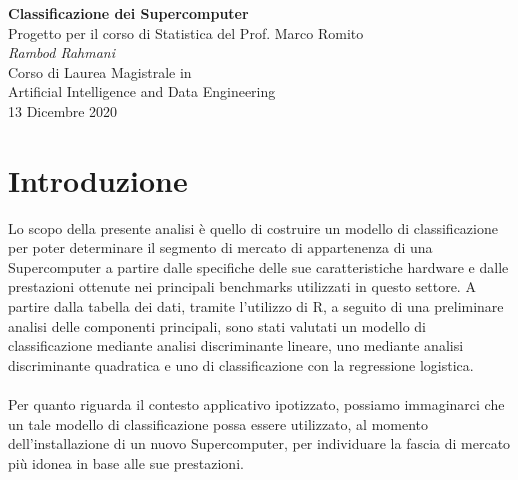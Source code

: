 \documentclass[11pt,a4paper]{article}
\begin{document}
\begin{center}
	\Large\textbf{Classificazione dei Supercomputer}\\
	\vspace{0.2cm}
	\large{Progetto per il corso di Statistica del Prof. Marco Romito}\\
	\vspace{0.5cm}
	\large\textit{Rambod Rahmani}\\
	\vspace{0.2cm}
	\scriptsize{Corso di Laurea Magistrale in\\Artificial Intelligence and
	Data Engineering}\\
	\vspace{0.5cm}
	\normalsize{13 Dicembre 2020}
\end{center}

\tableofcontents

\section{Introduzione}
Lo scopo della presente analisi \`e quello di costruire un modello di
classificazione per poter determinare il segmento di mercato di appartenenza di
una Supercomputer a partire dalle specifiche delle sue caratteristiche hardware
e dalle prestazioni ottenute nei principali benchmarks utilizzati in questo
settore.
A partire dalla tabella dei dati, tramite l'utilizzo di R, a seguito di una
preliminare analisi delle componenti principali, sono stati valutati un modello
di classificazione mediante analisi discriminante lineare, uno mediante analisi
discriminante quadratica e uno di classificazione con la regressione
logistica.\\
\\
Per quanto riguarda il contesto applicativo ipotizzato, possiamo immaginarci che
un tale modello di classificazione possa essere utilizzato, al momento
dell'installazione di un nuovo Supercomputer, per individuare la fascia di
mercato pi\`u idonea in base alle sue prestazioni.
\end{document}

